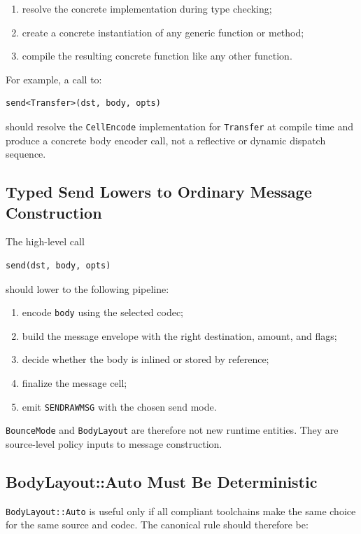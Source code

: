\documentclass[12pt,oneside]{article}
\begin{document}
\begin{enumerate}
\item resolve the concrete implementation during type checking;
\item create a concrete instantiation of any generic function or method;
\item compile the resulting concrete function like any other function.
\end{enumerate}

For example, a call to:

\begin{verbatim}
send<Transfer>(dst, body, opts)
\end{verbatim}

should resolve the \verb|CellEncode| implementation for \verb|Transfer| at
compile time and produce a concrete body encoder call, not a reflective or
dynamic dispatch sequence.

\subsection{Typed Send Lowers to Ordinary Message Construction}
\label{sec:send-lowering}
The high-level call

\begin{verbatim}
send(dst, body, opts)
\end{verbatim}

should lower to the following pipeline:

\begin{enumerate}
\item encode \verb|body| using the selected codec;
\item build the message envelope with the right destination, amount, and flags;
\item decide whether the body is inlined or stored by reference;
\item finalize the message cell;
\item emit \verb|SENDRAWMSG| with the chosen send mode.
\end{enumerate}

\verb|BounceMode| and \verb|BodyLayout| are therefore not new runtime entities.
They are source-level policy inputs to message construction.

\subsection{BodyLayout::Auto Must Be Deterministic}
\verb|BodyLayout::Auto| is useful only if all compliant toolchains make the same
choice for the same source and codec. The canonical rule should therefore be:
\end{document}
